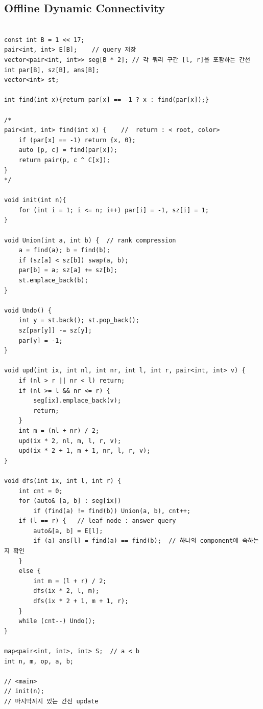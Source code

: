 \documentclass[landscape, 8pt, a4paper, oneside, twocolumn]{extarticle}
\begin{document}
\subsection {Offline Dynamic Connectivity}
\begin{verbatim}

const int B = 1 << 17;
pair<int, int> E[B];    // query 저장
vector<pair<int, int>> seg[B * 2]; // 각 쿼리 구간 [l, r]을 포함하는 간선
int par[B], sz[B], ans[B];
vector<int> st;

int find(int x){return par[x] == -1 ? x : find(par[x]);}

/*
pair<int, int> find(int x) {    //  return : < root, color>
    if (par[x] == -1) return {x, 0};
    auto [p, c] = find(par[x]);
    return pair(p, c ^ C[x]);
}
*/

void init(int n){
    for (int i = 1; i <= n; i++) par[i] = -1, sz[i] = 1;
}

void Union(int a, int b) {  // rank compression
    a = find(a); b = find(b);
    if (sz[a] < sz[b]) swap(a, b);
    par[b] = a; sz[a] += sz[b];
    st.emplace_back(b);
}

void Undo() {
    int y = st.back(); st.pop_back();
    sz[par[y]] -= sz[y];
    par[y] = -1;
}

void upd(int ix, int nl, int nr, int l, int r, pair<int, int> v) {
    if (nl > r || nr < l) return;
    if (nl >= l && nr <= r) {
        seg[ix].emplace_back(v);
        return;
    }
    int m = (nl + nr) / 2;
    upd(ix * 2, nl, m, l, r, v);
    upd(ix * 2 + 1, m + 1, nr, l, r, v);
}

void dfs(int ix, int l, int r) {
    int cnt = 0;
    for (auto& [a, b] : seg[ix])
        if (find(a) != find(b)) Union(a, b), cnt++;
    if (l == r) {   // leaf node : answer query
        auto&[a, b] = E[l];
        if (a) ans[l] = find(a) == find(b);  // 하나의 component에 속하는지 확인
    }
    else {
        int m = (l + r) / 2;
        dfs(ix * 2, l, m);
        dfs(ix * 2 + 1, m + 1, r);
    }
    while (cnt--) Undo();
}

map<pair<int, int>, int> S;  // a < b
int n, m, op, a, b;

// <main>
// init(n);
// 마지막까지 있는 간선 update

\end{verbatim}
\end{document}
